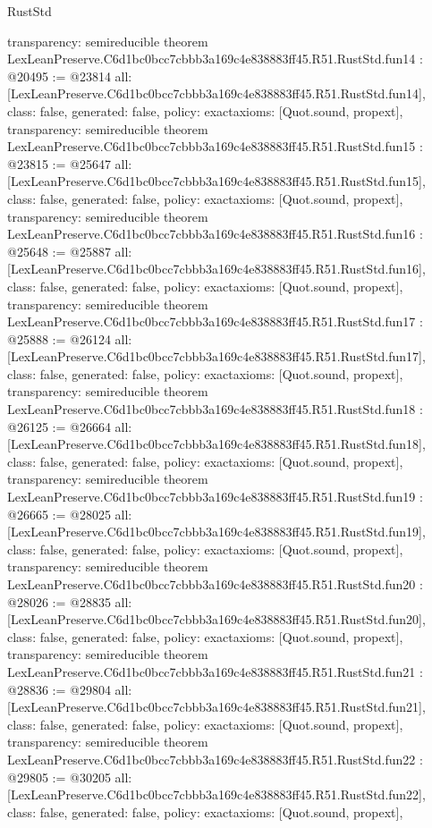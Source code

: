 \begin{lexlean}{RustStd}
\begin{coremodule}
{  transparency: semireducible
}
theorem LexLeanPreserve.C6d1bc0bcc7cbbb3a169c4e838883ff45.R51.RustStd.fun14 : @20495 := @23814 {
  all: [LexLeanPreserve.C6d1bc0bcc7cbbb3a169c4e838883ff45.R51.RustStd.fun14],
  class: false,
  generated: false,
  policy: exact{axioms: [Quot.sound, propext]},
  transparency: semireducible
}
theorem LexLeanPreserve.C6d1bc0bcc7cbbb3a169c4e838883ff45.R51.RustStd.fun15 : @23815 := @25647 {
  all: [LexLeanPreserve.C6d1bc0bcc7cbbb3a169c4e838883ff45.R51.RustStd.fun15],
  class: false,
  generated: false,
  policy: exact{axioms: [Quot.sound, propext]},
  transparency: semireducible
}
theorem LexLeanPreserve.C6d1bc0bcc7cbbb3a169c4e838883ff45.R51.RustStd.fun16 : @25648 := @25887 {
  all: [LexLeanPreserve.C6d1bc0bcc7cbbb3a169c4e838883ff45.R51.RustStd.fun16],
  class: false,
  generated: false,
  policy: exact{axioms: [Quot.sound, propext]},
  transparency: semireducible
}
theorem LexLeanPreserve.C6d1bc0bcc7cbbb3a169c4e838883ff45.R51.RustStd.fun17 : @25888 := @26124 {
  all: [LexLeanPreserve.C6d1bc0bcc7cbbb3a169c4e838883ff45.R51.RustStd.fun17],
  class: false,
  generated: false,
  policy: exact{axioms: [Quot.sound, propext]},
  transparency: semireducible
}
theorem LexLeanPreserve.C6d1bc0bcc7cbbb3a169c4e838883ff45.R51.RustStd.fun18 : @26125 := @26664 {
  all: [LexLeanPreserve.C6d1bc0bcc7cbbb3a169c4e838883ff45.R51.RustStd.fun18],
  class: false,
  generated: false,
  policy: exact{axioms: [Quot.sound, propext]},
  transparency: semireducible
}
theorem LexLeanPreserve.C6d1bc0bcc7cbbb3a169c4e838883ff45.R51.RustStd.fun19 : @26665 := @28025 {
  all: [LexLeanPreserve.C6d1bc0bcc7cbbb3a169c4e838883ff45.R51.RustStd.fun19],
  class: false,
  generated: false,
  policy: exact{axioms: [Quot.sound, propext]},
  transparency: semireducible
}
theorem LexLeanPreserve.C6d1bc0bcc7cbbb3a169c4e838883ff45.R51.RustStd.fun20 : @28026 := @28835 {
  all: [LexLeanPreserve.C6d1bc0bcc7cbbb3a169c4e838883ff45.R51.RustStd.fun20],
  class: false,
  generated: false,
  policy: exact{axioms: [Quot.sound, propext]},
  transparency: semireducible
}
theorem LexLeanPreserve.C6d1bc0bcc7cbbb3a169c4e838883ff45.R51.RustStd.fun21 : @28836 := @29804 {
  all: [LexLeanPreserve.C6d1bc0bcc7cbbb3a169c4e838883ff45.R51.RustStd.fun21],
  class: false,
  generated: false,
  policy: exact{axioms: [Quot.sound, propext]},
  transparency: semireducible
}
theorem LexLeanPreserve.C6d1bc0bcc7cbbb3a169c4e838883ff45.R51.RustStd.fun22 : @29805 := @30205 {
  all: [LexLeanPreserve.C6d1bc0bcc7cbbb3a169c4e838883ff45.R51.RustStd.fun22],
  class: false,
  generated: false,
  policy: exact{axioms: [Quot.sound, propext]},
}
\end{coremodule}
\end{lexlean}
